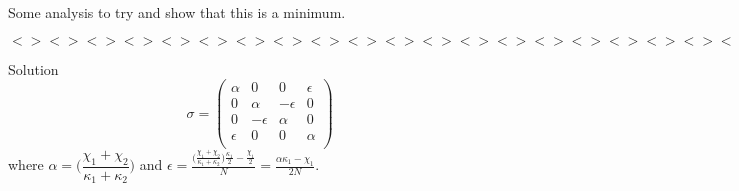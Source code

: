 \documentclass[11pt,a4paper]{article}
\numberwithin{equation}{section}
\begin{document}
	Some analysis to try and show that this is a minimum.
	
	$<><><><><><><><><><><><><><><><><><><><><><><><>$
		
	\iffalse

	Solution
	\begin{equation*}
	\sigma = \begin{pmatrix}
	\alpha & 0 & 0 & \epsilon\\
	0 & \alpha & -\epsilon & 0\\
	0 & -\epsilon & \alpha & 0 \\
	\epsilon & 0 & 0 & \alpha\\
	\end{pmatrix}
	\end{equation*}	
	where $\alpha = \Big(\dfrac{\chi_1 + \chi_2}{\kappa_1 + \kappa_2}\Big)$ and $\epsilon = \frac{\big(\frac{\chi_1 + \chi_2}{\kappa_1 + \kappa_2}\big) \frac{\kappa_1}{2} - \frac{\chi_1}{2}}{N} = \frac{\alpha \kappa_1 - \chi_1}{2N}$.
	
\end{document}
